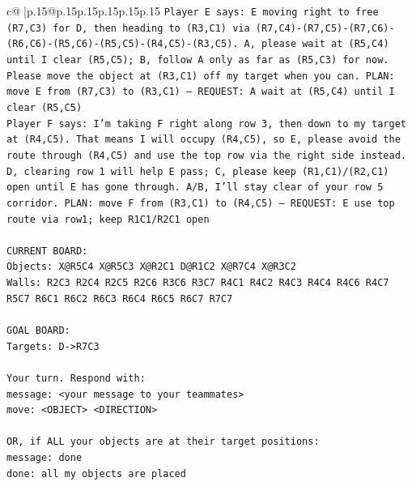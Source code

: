 \documentclass{article}
\begin{document}
{\begin{supertabular}{c@{$\;$}|p{.15\linewidth}@{}p{.15\linewidth}p{.15\linewidth}p{.15\linewidth}p{.15\linewidth}p{.15\linewidth}}
{{{\texttt{Player E says: E moving right to free (R7,C3) for D, then heading to (R3,C1) via (R7,C4){-}(R7,C5){-}(R7,C6){-}(R6,C6){-}(R5,C6){-}(R5,C5){-}(R4,C5){-}(R3,C5). A, please wait at (R5,C4) until I clear (R5,C5); B, follow A only as far as (R5,C3) for now. Please move the object at (R3,C1) off my target when you can. PLAN: move E from (R7,C3) to (R3,C1) — REQUEST: A wait at (R5,C4) until I clear (R5,C5)} \\
\texttt{Player F says: I’m taking F right along row 3, then down to my target at (R4,C5). That means I will occupy (R4,C5), so E, please avoid the route through (R4,C5) and use the top row via the right side instead. D, clearing row 1 will help E pass; C, please keep (R1,C1)/(R2,C1) open until E has gone through. A/B, I’ll stay clear of your row 5 corridor. PLAN: move F from (R3,C1) to (R4,C5) — REQUEST: E use top route via row1; keep R1C1/R2C1 open} \\
\\ 
\texttt{CURRENT BOARD:} \\
\texttt{Objects: X@R5C4 X@R5C3 X@R2C1 D@R1C2 X@R7C4 X@R3C2} \\
\texttt{Walls: R2C3 R2C4 R2C5 R2C6 R3C6 R3C7 R4C1 R4C2 R4C3 R4C4 R4C6 R4C7 R5C7 R6C1 R6C2 R6C3 R6C4 R6C5 R6C7 R7C7} \\
\\ 
\texttt{GOAL BOARD:} \\
\texttt{Targets: D{-}>R7C3} \\
\\ 
\texttt{Your turn. Respond with:} \\
\texttt{message: <your message to your teammates>} \\
\texttt{move: <OBJECT> <DIRECTION>} \\
\\ 
\texttt{OR, if ALL your objects are at their target positions:} \\
\texttt{message: done} \\
\texttt{done: all my objects are placed} \\
            }
        }
    }
     \\ \\


\end{supertabular}}
\end{document}
